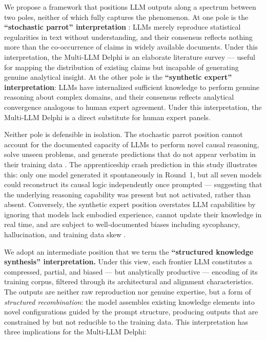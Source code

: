 \documentclass[preprint,review,12pt]{elsarticle}
\begin{document}
We propose a framework that positions LLM outputs along a spectrum between two poles, neither of which fully captures the phenomenon. At one pole is the \textbf{``stochastic parrot'' interpretation} \citep{bender2021parrots}: LLMs merely reproduce statistical regularities in text without understanding, and their consensus reflects nothing more than the co-occurrence of claims in widely available documents. Under this interpretation, the Multi-LLM Delphi is an elaborate literature survey --- useful for mapping the distribution of existing claims but incapable of generating genuine analytical insight. At the other pole is the \textbf{``synthetic expert'' interpretation}: LLMs have internalized sufficient knowledge to perform genuine reasoning about complex domains, and their consensus reflects analytical convergence analogous to human expert agreement. Under this interpretation, the Multi-LLM Delphi is a direct substitute for human expert panels.

Neither pole is defensible in isolation. The stochastic parrot position cannot account for the documented capacity of LLMs to perform novel causal reasoning, solve unseen problems, and generate predictions that do not appear verbatim in their training data \citep{wei2022emergent, bubeck2023sparks}. The apprenticeship crash prediction in this study illustrates this: only one model generated it spontaneously in Round~1, but all seven models could reconstruct its causal logic independently once prompted --- suggesting that the underlying reasoning capability was present but not activated, rather than absent. Conversely, the synthetic expert position overstates LLM capabilities by ignoring that models lack embodied experience, cannot update their knowledge in real time, and are subject to well-documented biases including sycophancy, hallucination, and training data skew \citep{perez2023sycophancy, sharma2024sycophancy}.

We adopt an intermediate position that we term the \textbf{``structured knowledge synthesis'' interpretation.} Under this view, each frontier LLM constitutes a compressed, partial, and biased --- but analytically productive --- encoding of its training corpus, filtered through its architectural and alignment characteristics. The outputs are neither raw reproduction nor genuine expertise, but a form of \textit{structured recombination}: the model assembles existing knowledge elements into novel configurations guided by the prompt structure, producing outputs that are constrained by but not reducible to the training data. This interpretation has three implications for the Multi-LLM Delphi:
\end{document}
